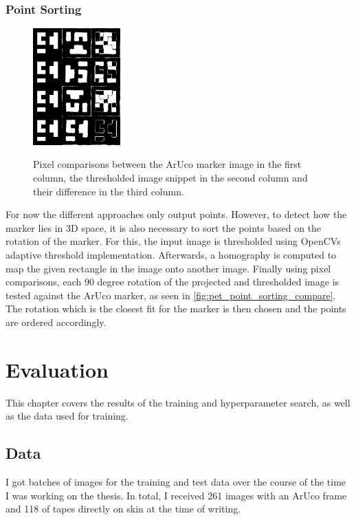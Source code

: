 \documentclass[10pt]{book}
\newcommand{\figureref}[1]{\autoref{#1}}
\begin{document}
\subsection{Point Sorting}

\begin{figure}
  \caption{Pixel comparisons between the \ac{ArUco} marker image in the first column, the thresholded image snippet in the second column and their difference in the third column.}
  \includegraphics[width=0.3\textwidth]{image/pet_point_sorting_compare}
  \label{fig:pet_point_sorting_compare}
\end{figure}

For now the different approaches only output points. However, to detect how the marker lies in 3D space, it is also necessary to sort the points based on the rotation of the marker. For this, the input image is thresholded using \acp{OpenCV} adaptive threshold implementation. Afterwards, a homography is computed to map the given rectangle in the image onto another image. Finally using pixel comparisons, each 90 degree rotation of the projected and thresholded image is tested against the \ac{ArUco} marker, as seen in \figureref{fig:pet_point_sorting_compare}. The rotation which is the closest fit for the marker is then chosen and the points are ordered accordingly.

\chapter{Evaluation}
\label{chap:eval}

This chapter covers the results of the training and hyperparameter search, as well as the data used for training.

\section{Data}

I got batches of images for the training and test data over the course of the time I was working on the thesis. In total, I received 261 images with an \ac{ArUco} frame and 118 of tapes directly on skin at the time of writing. 
\end{document}

